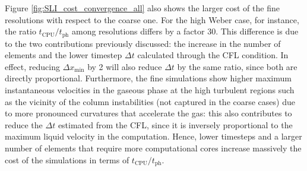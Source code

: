 Figure \ref{fig:SLI_cost_convergence_all} also shows the larger cost of the fine resolutions with respect to the coarse one. For the high Weber case, for instance, the ratio $t_\mathrm{CPU}/t_\mathrm{ph}$ among resolutions differs by a factor 30. This difference is due to the two contributions previously discussed: the increase in the number of elements and the lower timestep $\Delta t$ calculated through the CFL condition. In effect, reducing $\Delta x_\mathrm{min}$ by 2 will also reduce $\Delta t$ by the same ratio, since both are directly proportional. Furthermore, the fine simulations show higher maximum instantaneous velocities in the gaseous phase at the high turbulent regions such as the vicinity of the column instabilities (not captured in the coarse cases) due to more pronounced curvatures that accelerate the gas: this also contributes to reduce the $\Delta t$ estimated from the CFL, since it is inversely proportional to the maximum liquid velocity in the computation. Hence, lower timesteps and a larger number of elements that require more computational cores increase massively the cost of the simulations in terms of $t_\mathrm{CPU}/t_\mathrm{ph}$.

